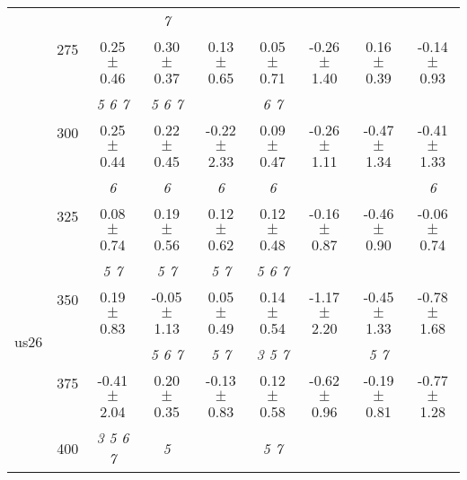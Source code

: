 \begin{table}[h]
{\begin{tabular}{
        ccccccccc}
 & \multirow{2}{*}{275}& \cellcolor[HTML]{EFEFEF} & \cellcolor[HTML]{EFEFEF} \textit{ 7 }& \cellcolor[HTML]{EFEFEF} & \cellcolor[HTML]{EFEFEF} & \cellcolor[HTML]{EFEFEF} & \cellcolor[HTML]{EFEFEF} & \cellcolor[HTML]{EFEFEF}  \\ 
 & & \cellcolor[HTML]{EFEFEF} 0.25 $\pm$ 0.46& \cellcolor[HTML]{EFEFEF} 0.30 $\pm$ 0.37& \cellcolor[HTML]{EFEFEF} 0.13 $\pm$ 0.65& \cellcolor[HTML]{EFEFEF} 0.05 $\pm$ 0.71& \cellcolor[HTML]{EFEFEF} -0.26 $\pm$ 1.40& \cellcolor[HTML]{EFEFEF} 0.16 $\pm$ 0.39& \cellcolor[HTML]{EFEFEF} -0.14 $\pm$ 0.93 \\ 
 & \multirow{2}{*}{300}& \textit{ 5 6 7 }& \textit{ 5 6 7 }& & \textit{ 6 7 }& & &  \\ 
 & & 0.25 $\pm$ 0.44& 0.22 $\pm$ 0.45& -0.22 $\pm$ 2.33& 0.09 $\pm$ 0.47& -0.26 $\pm$ 1.11& -0.47 $\pm$ 1.34& -0.41 $\pm$ 1.33 \\ 
 & \multirow{2}{*}{325}& \cellcolor[HTML]{EFEFEF} \textit{ 6 }& \cellcolor[HTML]{EFEFEF} \textit{ 6 }& \cellcolor[HTML]{EFEFEF} \textit{ 6 }& \cellcolor[HTML]{EFEFEF} \textit{ 6 }& \cellcolor[HTML]{EFEFEF} & \cellcolor[HTML]{EFEFEF} & \cellcolor[HTML]{EFEFEF} \textit{ 6 } \\ 
 & & \cellcolor[HTML]{EFEFEF} 0.08 $\pm$ 0.74& \cellcolor[HTML]{EFEFEF} 0.19 $\pm$ 0.56& \cellcolor[HTML]{EFEFEF} 0.12 $\pm$ 0.62& \cellcolor[HTML]{EFEFEF} 0.12 $\pm$ 0.48& \cellcolor[HTML]{EFEFEF} -0.16 $\pm$ 0.87& \cellcolor[HTML]{EFEFEF} -0.46 $\pm$ 0.90& \cellcolor[HTML]{EFEFEF} -0.06 $\pm$ 0.74 \\ 
 \multirow{4}{*}{us26} & \multirow{2}{*}{350}& \textit{ 5 7 }& \textit{ 5 7 }& \textit{ 5 7 }& \textit{ 5 6 7 }& & &  \\ 
 & & 0.19 $\pm$ 0.83& -0.05 $\pm$ 1.13& 0.05 $\pm$ 0.49& 0.14 $\pm$ 0.54& -1.17 $\pm$ 2.20& -0.45 $\pm$ 1.33& -0.78 $\pm$ 1.68 \\ 
 & \multirow{2}{*}{375}& \cellcolor[HTML]{EFEFEF} & \cellcolor[HTML]{EFEFEF} \textit{ 5 6 7 }& \cellcolor[HTML]{EFEFEF} \textit{ 5 7 }& \cellcolor[HTML]{EFEFEF} \textit{ 3 5 7 }& \cellcolor[HTML]{EFEFEF} & \cellcolor[HTML]{EFEFEF} \textit{ 5 7 }& \cellcolor[HTML]{EFEFEF}  \\ 
 & & \cellcolor[HTML]{EFEFEF} -0.41 $\pm$ 2.04& \cellcolor[HTML]{EFEFEF} 0.20 $\pm$ 0.35& \cellcolor[HTML]{EFEFEF} -0.13 $\pm$ 0.83& \cellcolor[HTML]{EFEFEF} 0.12 $\pm$ 0.58& \cellcolor[HTML]{EFEFEF} -0.62 $\pm$ 0.96& \cellcolor[HTML]{EFEFEF} -0.19 $\pm$ 0.81& \cellcolor[HTML]{EFEFEF} -0.77 $\pm$ 1.28 \\ 
 & \multirow{2}{*}{400}& \textit{ 3 5 6 7 }& \textit{ 5 }& & \textit{ 5 7 }& & &  \\ 

\end{tabular}}
\end{table}
